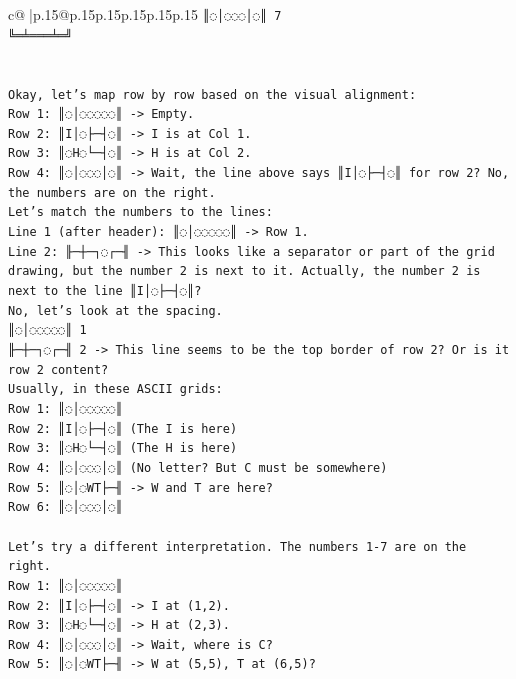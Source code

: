 \documentclass{article}
\begin{document}
{\begin{supertabular}{c@{$\;$}|p{.15\linewidth}@{}p{.15\linewidth}p{.15\linewidth}p{.15\linewidth}p{.15\linewidth}p{.15\linewidth}}
{{{\texttt{║◌│◌◌◌│◌║ 7} \\
\texttt{╚═╧═══╧═╝} \\
\\ 
\\ 
\texttt{Okay, let's map row by row based on the visual alignment:} \\
\texttt{Row 1: ║◌│◌◌◌◌◌║ {-}> Empty.} \\
\texttt{Row 2: ║I│◌├─┤◌║ {-}> I is at Col 1.} \\
\texttt{Row 3: ║◌H◌└─┤◌║ {-}> H is at Col 2.} \\
\texttt{Row 4: ║◌│◌◌◌│◌║ {-}> Wait, the line above says ║I│◌├─┤◌║ for row 2? No, the numbers are on the right.} \\
\texttt{Let's match the numbers to the lines:} \\
\texttt{Line 1 (after header): ║◌│◌◌◌◌◌║ {-}> Row 1.} \\
\texttt{Line 2: ╟─┼─┐◌┌─╢ {-}> This looks like a separator or part of the grid drawing, but the number 2 is next to it. Actually, the number 2 is next to the line ║I│◌├─┤◌║?} \\
\texttt{No, let's look at the spacing.} \\
\texttt{║◌│◌◌◌◌◌║ 1} \\
\texttt{╟─┼─┐◌┌─╢ 2 {-}> This line seems to be the top border of row 2? Or is it row 2 content?} \\
\texttt{Usually, in these ASCII grids:} \\
\texttt{Row 1: ║◌│◌◌◌◌◌║} \\
\texttt{Row 2: ║I│◌├─┤◌║ (The I is here)} \\
\texttt{Row 3: ║◌H◌└─┤◌║ (The H is here)} \\
\texttt{Row 4: ║◌│◌◌◌│◌║ (No letter? But C must be somewhere)} \\
\texttt{Row 5: ║◌│◌WT├─╢ {-}> W and T are here?} \\
\texttt{Row 6: ║◌│◌◌◌│◌║} \\
\\ 
\texttt{Let's try a different interpretation. The numbers 1{-}7 are on the right.} \\
\texttt{Row 1: ║◌│◌◌◌◌◌║} \\
\texttt{Row 2: ║I│◌├─┤◌║ {-}> I at (1,2).} \\
\texttt{Row 3: ║◌H◌└─┤◌║ {-}> H at (2,3).} \\
\texttt{Row 4: ║◌│◌◌◌│◌║ {-}> Wait, where is C?} \\
\texttt{Row 5: ║◌│◌WT├─╢ {-}> W at (5,5), T at (6,5)?} \\
}}}
\end{supertabular}}
\end{document}
